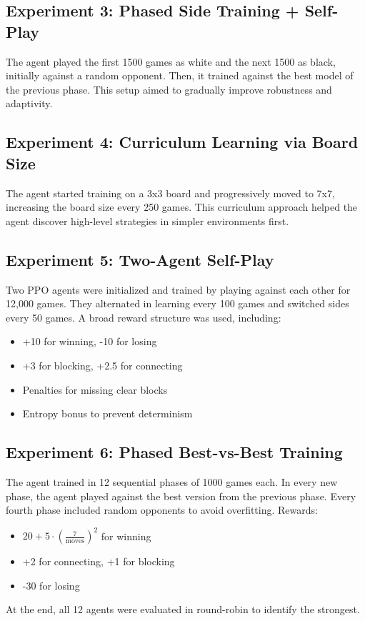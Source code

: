 \documentclass[conference]{IEEEtran}
\begin{document}
\subsection{Experiment 3: Phased Side Training + Self-Play}

The agent played the first 1500 games as white and the next 1500 as black, initially against a random opponent. Then, it trained against the best model of the previous phase. This setup aimed to gradually improve robustness and adaptivity.

\subsection{Experiment 4: Curriculum Learning via Board Size}

The agent started training on a 3x3 board and progressively moved to 7x7, increasing the board size every 250 games. This curriculum approach helped the agent discover high-level strategies in simpler environments first.

\subsection{Experiment 5: Two-Agent Self-Play}

Two PPO agents were initialized and trained by playing against each other for 12,000 games. They alternated in learning every 100 games and switched sides every 50 games. A broad reward structure was used, including:
\begin{itemize}
    \item +10 for winning, -10 for losing
    \item +3 for blocking, +2.5 for connecting
    \item Penalties for missing clear blocks
    \item Entropy bonus to prevent determinism
\end{itemize}

\subsection{Experiment 6: Phased Best-vs-Best Training}

The agent trained in 12 sequential phases of 1000 games each. In every new phase, the agent played against the best version from the previous phase. Every fourth phase included random opponents to avoid overfitting. Rewards:
\begin{itemize}
    \item $20 + 5 \cdot \left(\frac{7}{\text{moves}}\right)^2$ for winning
    \item +2 for connecting, +1 for blocking
    \item -30 for losing
\end{itemize}
At the end, all 12 agents were evaluated in round-robin to identify the strongest.
\end{document}
